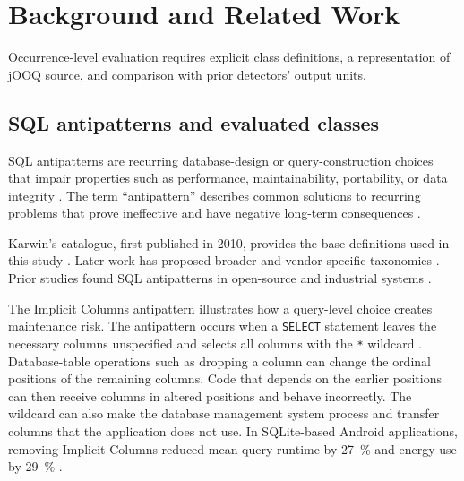 \section{Background and Related Work}\label{sec:background}

Occurrence-level evaluation requires explicit class definitions, a representation of jOOQ source, and comparison with prior detectors' output units.

\subsection{SQL antipatterns and evaluated classes}\label{sec:sqlAntipatterns}

SQL antipatterns are recurring database-design or query-construction choices that impair properties such as performance, maintainability, portability, or data integrity \citetext{\citealp[p. 1]{karwin2023sql}; \citealp[p. 4]{alshemaimri2021survey}}. The term ``antipattern'' describes common solutions to recurring problems that prove ineffective and have negative long-term consequences \citetext{\citealp[p. 46]{koenig1995patterns}; \citealp[p. 4]{ambler1998process}; \citealp[p. 6]{brown1998antipatterns}}.

Karwin's catalogue, first published in 2010, provides the base definitions used in this study . Later work has proposed broader and vendor-specific taxonomies . Prior studies found SQL antipatterns in open-source and industrial systems . 

The Implicit Columns antipattern illustrates how a query-level choice creates maintenance risk. The antipattern occurs when a \texttt{SELECT} statement leaves the necessary columns unspecified and selects all columns with the \texttt{*} wildcard . Database-table operations such as dropping a column can change the ordinal positions of the remaining columns. Code that depends on the earlier positions can then receive columns in altered positions and behave incorrectly. The wildcard can also make the database management system process and transfer columns that the application does not use. In SQLite-based Android applications, removing Implicit Columns reduced mean query runtime by \qty{27}{\percent} and energy use by \qty{29}{\percent} .

